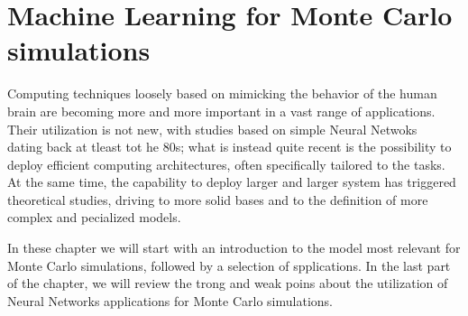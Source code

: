 \chapter{Machine Learning for Monte Carlo simulations}
Computing techniques loosely based on mimicking the behavior of the human brain are becoming more and more important in a vast range of applications.
Their utilization is not new, with studies based on simple Neural Netwoks~\cite{nn1,nn2,nn3} dating back at tleast tot he 80s; what is instead quite recent is the possibility to deploy efficient computing architectures, often specifically tailored to the tasks.
At the same time, the capability to deploy larger and larger system has triggered theoretical studies, driving to more solid bases and to  the definition of more complex and pecialized models.

In these chapter we will start with an introduction to the model most relevant for Monte Carlo simulations, followed by a selection of spplications. In the last part of the chapter, we will review the trong and weak poins about the utilization of Neural Networks applications for Monte Carlo simulations.
